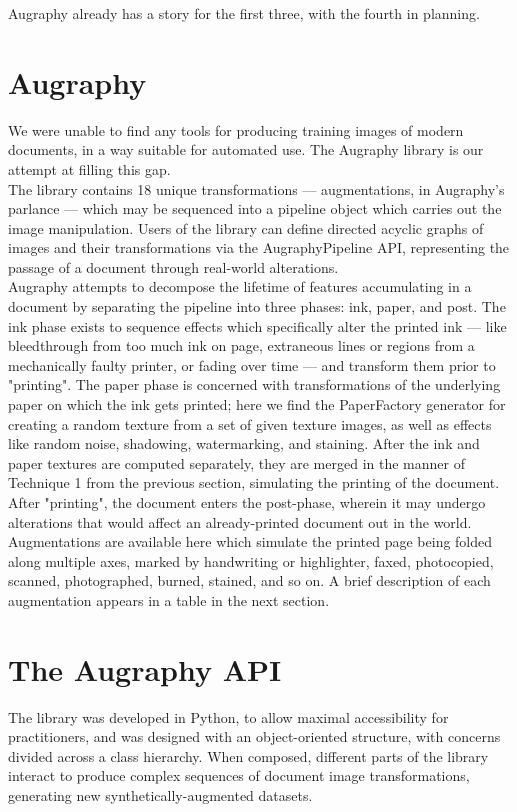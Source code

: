 \documentclass[runningheads]{article}
\begin{document}
Augraphy already has a story for the first three, with the fourth in planning.

\section{Augraphy}
\label{sec:org4a1c65c}
We were unable to find any tools for producing training images of modern documents, in a way suitable for automated use. The Augraphy library is our attempt at filling this gap.\\

The library contains 18 unique transformations — augmentations, in Augraphy's parlance — which may be sequenced into a pipeline object which carries out the image manipulation. Users of the library can define directed acyclic graphs of images and their transformations via the AugraphyPipeline API, representing the passage of a document through real-world alterations.\\

Augraphy attempts to decompose the lifetime of features accumulating in a document by separating the pipeline into three phases: ink, paper, and post. The ink phase exists to sequence effects which specifically alter the printed ink — like bleedthrough from too much ink on page, extraneous lines or regions from a mechanically faulty printer, or fading over time — and transform them prior to "printing". The paper phase is concerned with transformations of the underlying paper on which the ink gets printed; here we find the PaperFactory generator for creating a random texture from a set of given texture images, as well as effects like random noise, shadowing, watermarking, and staining. After the ink and paper textures are computed separately, they are merged in the manner of Technique 1 from the previous section, simulating the printing of the document. After "printing", the document enters the post-phase, wherein it may undergo alterations that would affect an already-printed document out in the world. Augmentations are available here which simulate the printed page being folded along multiple axes, marked by handwriting or highlighter, faxed, photocopied, scanned, photographed, burned, stained, and so on. A brief description of each augmentation appears in a table in the next section.

\section{The Augraphy API}
\label{sec:orgd64a7b1}
The library was developed in Python, to allow maximal accessibility for practitioners, and was designed with an object-oriented structure, with concerns divided across a class hierarchy. When composed, different parts of the library interact to produce complex sequences of document image transformations, generating new synthetically-augmented datasets.\\
\end{document}
